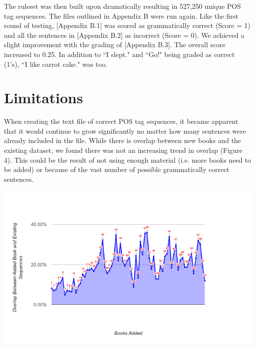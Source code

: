 \documentclass[11pt,a4paper]{article}
\begin{document}
\begin{multicols}{2}
The ruleset was then built upon dramatically resulting in 527,250 unique POS tag sequences. The files outlined in Appendix B were run again. Like the first round of testing, [Appendix B.1] was scored as grammatically correct (Score = 1) and all the sentences in [Appendix B.2] as incorrect (Score = 0). We achieved a slight improvement with the grading of [Appendix B.3]. The overall score increased to 0.25. In addition to ``I slept." and ``Go!" being graded as correct (1's), ``I like carrot cake." was too. 


\section{Limitations}
When creating the text file of correct POS tag sequences, it became apparent that it would continue to grow significantly no matter how many sentences were already included in the file. While there is overlap between new books and the existing dataset, we found there was not an increasing trend in overlap (Figure 4). This could be the result of not using enough material (i.e. more books need to be added) or because of the vast number of possible grammatically correct sentences.

\begin{center} 
   \centering
   \includegraphics[width=\linewidth]{bookOverlap}
\end{center}


\end{multicols}
\end{document}
